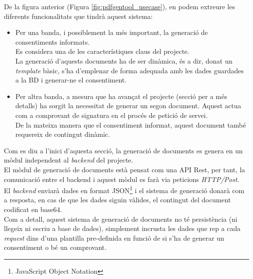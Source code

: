 \newline De la figura anterior (Figura \ref{fig:pdfgentool_usecase}), en podem extreure les diferents funcionalitats que tindrà aquest sistema:
\begin{itemize}
    \item Per una banda, i possiblement la més important, la generació de consentiments informats.\\
    Es considera una de les característiques claus del projecte.\\
    La generació d'aquests documents ha de ser dinàmica, és a dir, donat un \textit{template} bàsic, s'ha d'emplenar de forma adequada amb les dades guardades a la BD i generar-ne el consentiment.
    \item Per altra banda, a mesura que ha avançat el projecte (secció  per a més detalls) ha sorgit la necessitat de generar un segon document. Aquest actua com a comprovant de signatura en el procés de petició de servei.\\
    De la mateixa manera que el consentiment informat, aquest document també requereix de contingut dinàmic.
\end{itemize}
Com es diu a l'inici d'aquesta secció, la generació de documents es genera en un mòdul independent al \textit{backend} del projecte.\\
El mòdul de generació de documents està pensat com una API Rest, per tant, la comunicació entre el backend i aquest mòdul es farà via peticions \textit{HTTP/Post}.\\
\newline El \textit{backend} enviarà dades en format JSON\footnote{JavaScript Object Notation} i el sistema de generació donarà com a resposta, en cas de que les dades siguin vàlides, el contingut del document codificat en base64.\\
\newline Com a detall, aquest sistema de generació de documents no té persistència (ni llegeix ni escriu a base de dades), simplement incrusta les dades que rep a cada \textit{request} dins d'una plantilla pre-definida en funció de si s'ha de generar un consentiment o bé un comprovant.

